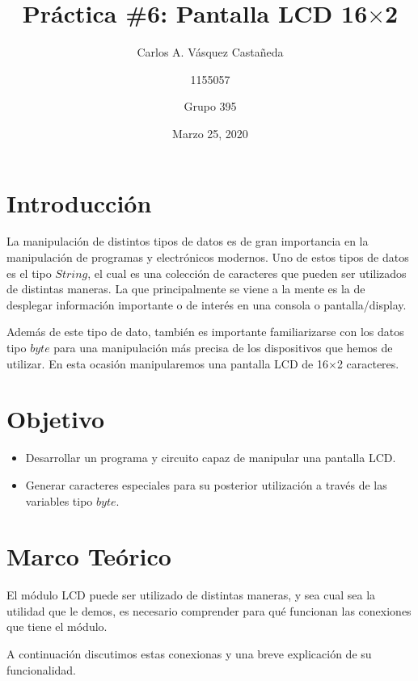 \documentclass[12pt, letterpaper]{article}
\title{Práctica \#6: Pantalla LCD 16$\times$2}
\author{Carlos A. Vásquez Castañeda \and 1155057 \and Grupo 395}
\date{Marzo 25, 2020}
\begin{document}
\maketitle
\section*{Introducción}

La manipulación de distintos tipos de datos es de gran importancia en la manipulación de programas y electrónicos modernos. Uno de estos tipos de datos es el tipo $String$, el cual es una colección de caracteres que pueden ser utilizados de distintas maneras. La que principalmente se viene a la mente es la de desplegar información importante o de interés en una consola o pantalla/display.

Además de este tipo de dato, también es importante familiarizarse con los datos tipo $byte$ para una manipulación más precisa de los dispositivos que hemos de utilizar. En esta ocasión manipularemos una pantalla LCD de 16$\times$2 caracteres.

\section*{Objetivo}
\begin{itemize}
	\item Desarrollar un programa y circuito capaz de manipular una pantalla LCD. 

	\item Generar caracteres especiales para su posterior utilización a través de las variables tipo $byte$.
\end{itemize}

\section*{Marco Teórico}

El módulo LCD puede ser utilizado de distintas maneras, y sea cual sea la utilidad que le demos, es necesario comprender para qué funcionan las conexiones que tiene el módulo.

A continuación discutimos estas conexionas y una breve explicación de su funcionalidad.
\end{document}
